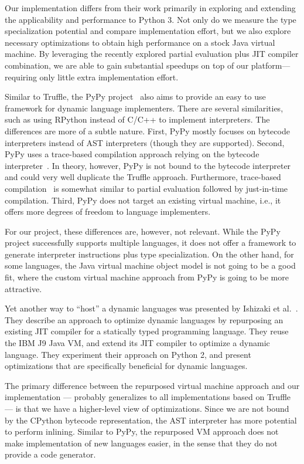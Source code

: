 Our implementation differs from their work primarily in exploring and extending the applicability and performance to Python 3.
Not only do we measure the type specialization potential and compare implementation effort, but we also explore necessary optimizations to obtain high performance on a stock Java virtual machine.
By leveraging the recently explored partial evaluation plus JIT compiler combination,
we are able to gain substantial speedups on top of our platform---requiring only little extra implementation effort.

Similar to Truffle, the PyPy project~\cite{Rigo2006} also aims to provide an easy to use framework for dynamic language implementers.
There are several similarities, such as using RPython instead of C/C++ to implement interpreters.
The differences are more of a subtle nature.
First, PyPy mostly  focuses on bytecode interpreters instead of AST interpreters (though they are supported).
Second, PyPy uses a trace-based compilation approach relying on the bytecode interpreter~\cite{bolz.etal09}.
In theory, however, PyPy is not bound to the bytecode interpreter and could very well duplicate the Truffle approach.
Furthermore, trace-based compilation~\cite{gal.etal+09,chang.etal+09,bebenita.etal+10,bebenita.etal+09,wimmer.etal+09} is somewhat similar to partial evaluation followed by just-in-time compilation.
Third, PyPy does not target an existing virtual machine, i.e., it offers more degrees of freedom to language implementers.

For our project, these differences are, however, not relevant.
While the PyPy project successfully supports multiple languages, it does not offer a framework to generate interpreter instructions plus type specialization.
On the other hand, for some languages, the Java virtual machine object model is not going to be a good fit, where the custom virtual machine approach from PyPy is going to be more attractive.

Yet another way to ``host'' a dynamic languages was presented by Ishizaki et al.~\cite{Ishizaki.etal+12}.
They describe an approach to optimize dynamic languages by repurposing an existing JIT compiler for a statically typed programming language.
They reuse the IBM J9 Java VM, and extend its JIT compiler to optimize a dynamic language.
They experiment their approach on Python 2, and present optimizations that are specifically beneficial for dynamic languages.

The primary difference between the repurposed virtual machine approach and our implementation --- probably generalizes to all implementations based on Truffle --- is that we have a higher-level view of optimizations.
Since we are not bound by the CPython bytecode representation, the AST interpreter has more potential to perform inlining.
Similar to PyPy, the repurposed VM approach does not make implementation of new languages easier, in the sense that they do not provide a code generator.

